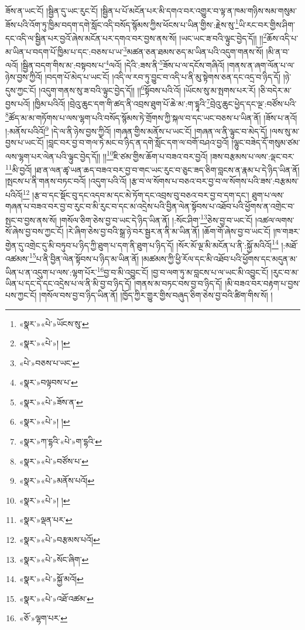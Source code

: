 ཟོས་ན་ཡང་ངོ། །སྦྱིན་དུ་ཡང་རུང་ངོ། །སྦྱིན་པ་པོ་མངོན་པར་མི་དགའ་བར་འགྱུར་བ་ལྟ་ན་ཁམ་གཉིས་སམ་གསུམ་ཟོས་པའི་འོག་ཏུ་ཁྱིམ་བདག་དགེ་སློང་འདི་བསོད་སྙོམས་ཀྱིས་ཕོངས་པ་ཡིན་གྱིས་:རྗེས་སུ་\footnote{«སྣར་»«པེ་»ཡོངས་སུ་}ཡི་རང་བར་གྱིས་ཤིག་དང་འདི་ལ་སྦྱིན་པར་བྱའོ་ཞེས་མངོན་པར་དགའ་བར་བྱས་ནས་སོ། །ཡང་ཡང་ཟ་བའི་ལྟུང་བྱེད་དོ།། །།\footnote{«སྣར་»«པེ་»། །}ཆོས་འདི་པ་མ་ཡིན་པ་བདག་པོ་ཁྱིམ་པ་དང་:བཅས་པ་ཡ་\footnote{«པེ་»བཅས་པ་ཡང་}མཚན་ཅན་ཐམས་ཅད་མ་ཡིན་པའི་འདུག་གནས་སོ། །མི་ན་བ་ལའོ། །སྦྱིན་བདག་གིས་མ་:བསྟབས་པ་\footnote{«སྣར་»བལྟབས་པ་}ལའོ། །དེའི་:ཟས་ནི་\footnote{«སྣར་»«པེ་»ཟོས་ན་}ཟོས་པ་ལ་དངོས་གཞིའོ། །གནས་ན་ཞག་ལོན་པ་ལ་ཉེས་བྱས་ཀྱིའོ། །བདག་པོ་མེད་པ་ཡང་ངོ། །འདི་ལ་རབ་ཏུ་བྱུང་བ་འདི་པ་ནི་མུ་སྟེགས་ཅན་དང་འདྲ་བ་ཉིད་དོ། །ཉེ་དུས་ཀྱང་ངོ། །འདུག་གནས་སུ་ཟ་བའི་ལྟུང་བྱེད་དོ།། །།\footnote{«སྣར་»«པེ་»། །}སྟོབས་པའི་འོ། །ཡོངས་སུ་མ་སྤགས་པར་རོ། །ཅི་བདེར་མ་བྱས་པའོ། །ཁྱིམ་པའིའོ། །བྲེའུ་ཆུང་དག་གི་ཚད་ནི་འབྲས་ཐུག་པོ་ཆེ་མ་:ག་དྷཱའི་\footnote{«སྣར་»ཀ་དྷའི་«པེ་»ག་དྷའི་}བྲེའུ་ཆུང་ཕྱེད་དང་ལྔ་:བཙོས་པའི་\footnote{«སྣར་»«པེ་»བཙོས་པ་}ཚོད་མ་མ་གཏོགས་པ་ལས་ལྷག་པའི་བསོད་སྙོམས་ཏེ་གྲོགས་ཀྱི་སྐལ་བ་དང་ཡང་བཅས་པ་ཡིན་ནོ། །ཟོས་པ་ནའོ། །:མནོས་པའིའོ།\footnote{«སྣར་»«པེ་»མནོས་པའོ།} །དེ་ལ་ནི་ཉེས་བྱས་ཀྱིའོ། །གཞན་གྱིས་མནོས་པ་ཡང་ངོ། །གཞན་ལ་ནི་ལྟུང་བ་མེད་དོ། །ལས་སུ་མ་བྱས་པ་ཡང་ངོ། །བླང་བར་བྱ་བ་གལ་ཏེ་མང་བ་ཉིད་ན་དགེ་སློང་དག་ལ་བགོ་བཤའ་བྱའོ། །ལྷུང་བཟེད་དོ་གསུམ་ཙམ་ལས་ལྷག་པར་ལེན་པའི་ལྟུང་བྱེད་དོ།། །།\footnote{«སྣར་»«པེ་»། །}ཇི་ཙམ་གྱིས་ཆོག་པ་བཟའ་བར་བྱའོ། །ཟས་བརྩམས་པ་ལས་:ལྡང་བར་\footnote{«སྣར་»ལྡན་པར་}མི་བྱའོ། །ཐ་ན་ལན་ཚྭ་ཡན་ཆད་བཟའ་བར་བྱ་བ་གང་ཡང་རུང་བ་ཅུང་ཟད་ཅིག་བླངས་ན་རྣམ་པ་དེ་ཉིད་ཡིན་ནོ། །སྤངས་པ་ནི་གནས་བཏང་བའོ། །འདུག་པའི་འོ། །རྩ་བ་ལ་སོགས་པ་བཅའ་བར་བྱ་བ་ལ་སོགས་པའི་ཟས་:བརྩམས་པའིའོ།\footnote{«སྣར་»«པེ་»བརྩམས་པའོ།} །རྩ་བ་དང་སྡོང་བུ་དང་འདབ་མ་དང་མེ་ཏོག་དང་འབྲས་བུ་བཅའ་བར་བྱ་བ་དག་དང་། ཐུག་པ་ལས་གཞན་པ་བཟའ་བར་བྱ་བ་རུང་བ་མི་རུང་བ་དང་མ་འདྲེས་པའི་བྱིན་ལེན་སྟོབས་པ་འཐོབ་པའི་ཕྱོགས་ན་འགྲེང་བ་སྤང་བ་བྱས་ནས་སོ། །གསོལ་ཅིག་ཅེས་བྱ་བ་ཡང་དེ་ཉིད་ཡིན་ནོ། །:སོང་ཤིག་\footnote{«སྣར་»«པེ་»སོང་ཞིག་}ཅེས་བྱ་བ་ཡང་ངོ། །འཚལ་ལགས་སོ་ཞེས་བྱ་བས་ཀྱང་ངོ། །རེ་ཞིག་ཅེས་བྱ་བའི་སྒྲ་ཉེ་བར་སྦྱར་ན་ནི་མ་ཡིན་ནོ། །ཆོག་གོ་ཞེས་བྱ་བ་ཡང་ངོ། །ཁ་གཟར་གྱེན་དུ་འགྲེང་དུ་མི་བཏུབ་པ་ཉིད་ཀྱི་ཐུག་པ་དག་ནི་ཐུག་པ་ཉིད་དོ། །སོར་མོ་ལྔ་མི་མངོན་པ་ནི་:སྐྱོ་མའིའོ།\footnote{«སྣར་»«པེ་»སྐྱོ་མའོ།} །:མཐོ་འཚམས་\footnote{«སྣར་»«པེ་»འཐོ་འཚམ་}པ་ནི་བྱིན་ལེན་སྟོབས་པ་ཉིད་མ་ཡིན་ནོ། །མཚམས་ཀྱི་ཕྱི་རོལ་དང་མི་འཐོབ་པའི་ཕྱོགས་དང་མདུན་མ་ཡིན་པ་ན་འདུག་པ་ལས་:ལྷག་པོར་\footnote{«ཅོ་»ལྷག་པར་}བྱ་བ་མི་འབྱུང་ངོ། །བྱ་བ་ལག་ཏུ་མ་བླངས་པ་ལ་ཡང་མི་འབྱུང་ངོ། །རུང་བ་མ་ཡིན་པ་དང་དེ་དང་འདྲེས་པ་ལ་ནི་མི་བྱ་བ་ཉིད་དོ། །གནས་མ་བཏང་བས་བྱ་བ་ཉིད་དོ། །མི་བཟའ་བར་བརྟག་པ་བྱས་པས་ཀྱང་ངོ། །གསོལ་བས་བྱ་བ་ཉིད་ཡིན་ནོ། །ཁྱོད་ཀྱིར་གྱུར་གྱིས་བཞུད་ཅིག་ཅེས་བྱ་བའི་ཚིག་གིས་སོ། །
